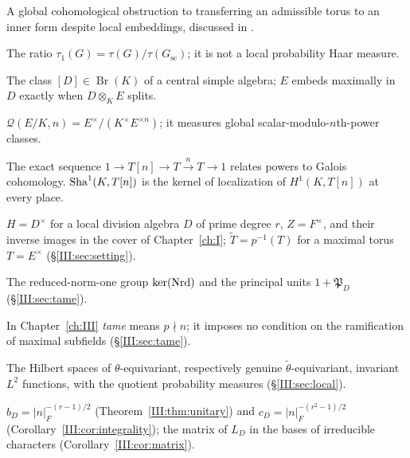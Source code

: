 \begin{description}[style=nextline,leftmargin=2.7cm,labelwidth=2.5cm,font=\normalfont\bfseries]
A global cohomological obstruction to transferring an admissible
torus to an inner form despite local embeddings, discussed in
\cite[\S9.5]{Kot84}.
\item[Relative Tamagawa number]
The ratio $\tau_1(G)=\tau(G)/\tau(G_{\mathrm{sc}})$; it is not
a local probability Haar measure.
\item[Brauer class]
The class $[D]\in\operatorname{Br}(K)$ of a central simple algebra;
$E$ embeds maximally in $D$ exactly when $D\otimes_K E$ splits.
\item[Scalar power quotient]
$\mathcal Q(E/K,n)=E^\times/(K^\times E^{\times n})$;
it measures global scalar-modulo-$n$th-power classes.
\item[Kummer and $\Sha^1$]
The exact sequence $1\to T[n]\to T\xrightarrow{n}T\to1$
relates powers to Galois cohomology. $\operatorname{Sha}^1(K,T[n])$ is the
kernel of localization of $H^1(K,T[n])$ at every place.
\item[$H$, $Z$, $\tH$, $\tZ$, $\widetilde T$]
$H=D^\times$ for a local division algebra $D$ of prime degree $r$, $Z=F^\times$, and their inverse images in the cover of Chapter~\ref{ch:I}; $\widetilde T=p^{-1}(T)$ for a maximal torus $T=E^\times$ (\S\ref{III:sec:setting}).
\item[$H^1$, $U_D^1$]
The reduced-norm-one group $\ker(\operatorname{Nrd})$ and the principal units $1+\mathfrak P_D$ (\S\ref{III:sec:tame}).
\item[Tame, wild]
In Chapter~\ref{ch:III} \emph{tame} means $p\nmid n$; it imposes no condition on the ramification of maximal subfields (\S\ref{III:sec:tame}).
\item[$\mathcal H_\theta(H)$, $\mathcal H_{\widetilde\theta}(\tH)$]
The Hilbert spaces of $\theta$-equivariant, respectively genuine $\tilde\theta$-equivariant, invariant $L^2$ functions, with the quotient probability measures (\S\ref{III:sec:local}).
\item[$b_D$, $c_D$; character matrix]
$b_D=|n|_F^{-(r-1)/2}$ (Theorem~\ref{III:thm:unitary}) and $c_D=|n|_F^{-(r^2-1)/2}$ (Corollary~\ref{III:cor:integrality}); the matrix of $L_D$ in the bases of irreducible characters (Corollary~\ref{III:cor:matrix}).

\end{description}
